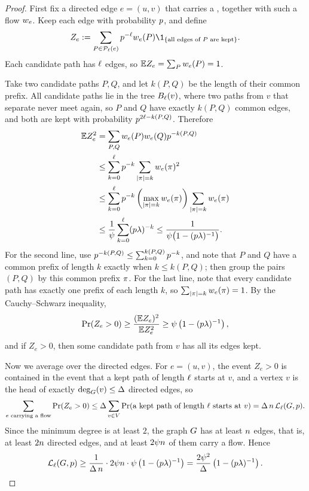 \begin{proof}
First fix a directed edge \(e=(u,v)\) that carries a \flowt{\brnum}{\gfrac},
together with such a flow \(w_{e}\). Keep each edge with probability
\(p\), and define
\[
  Z_e:=\sum_{P\in\Pset{e}}\keepp^{-\plen}\wt{e}(P)
     \1_{\{\text{all edges of }P\text{ are kept}\}}.
\]
Each candidate path has \(\ell\) edges, so \(\mathbb{E} Z_e=\sum_Pw_{e}(P)=1\).

Take two candidate paths \(P,Q\), and let \(k(P,Q)\) be the length of their
common prefix. All candidate paths lie in the tree \(B_{\ell}(v)\), where
two paths from \(v\) that separate never meet again, so \(P\) and \(Q\) have
exactly \(k(P,Q)\) common edges, and both are kept with probability
\(p^{2\ell-k(P,Q)}\). Therefore
\begin{align*}
  \mathbb{E} Z_e^2
  &=\sum_{P,Q}w_{e}(P)w_{e}(Q)p^{-k(P,Q)}\\
  &\le\sum_{k=0}^\ell p^{-k}
       \sum_{|\pi|=k}w_{e}(\pi)^2\\
  &\le\sum_{k=0}^\ell p^{-k}
       \left(\max_{|\pi|=k}w_{e}(\pi)\right)
       \sum_{|\pi|=k}w_{e}(\pi)\\
  &\le \frac{1}{\psi}\sum_{k=0}^\ell(p\lambda)^{-k}
   \le\frac{1}{\psi\bigl(1-(p\lambda)^{-1}\bigr)}.
\end{align*}
For the second line, use
\(p^{-k(P,Q)}\le\sum_{k=0}^{k(P,Q)}p^{-k}\), and note that \(P\) and
\(Q\) have a common prefix of length \(k\) exactly when \(k\le k(P,Q)\); then
group the pairs \((P,Q)\) by this common prefix \(\pi\). For the last
line, note that every candidate path has exactly one prefix of each length
\(k\), so \(\sum_{|\pi|=k}w_{e}(\pi)=1\). By the Cauchy--Schwarz
inequality,
\[
  \Prx{Z_e>0}\ge\frac{(\E Z_e)^2}{\E Z_e^2}
  \ge \gfrac\left(1-(\keepp\brnum)^{-1}\right),
\]
and if \(Z_e>0\), then some candidate path from \(v\) has all its edges kept.

Now we average over the directed edges. For \(e=(u,v)\), the event \(Z_e>0\) is
contained in the event that a kept path of length \(\ell\) starts at \(v\), and
a vertex \(v\) is the head of exactly \(\deg_{G}(v)\le\Delta\) directed edges,
so
\[
  \sum_{e\text{ carrying a flow}}\Prx{Z_e>0}
  \le
  \degb\sum_{v\in\Vset}
  \Prx{\text{a kept path of length }\plen\text{ starts at }v}
  =\degb\,\nvert\,\Lpath{\plen}{\Gin}{\keepp}.
\]
Since the minimum degree is at least \(2\), the graph \(G\) has at least
\(n\) edges, that is, at least \(2n\) directed edges, and at least
\(2\psi n\) of them carry a flow. Hence
\[
  \mathcal{L}_{\ell}(G,p)
  \ge \frac1{\Delta\,n}\cdot 2\psi n\cdot
       \psi\left(1-(p\lambda)^{-1}\right)
  =\frac{2\psi^2}{\Delta}
       \left(1-(p\lambda)^{-1}\right).
\]
\end{proof}


